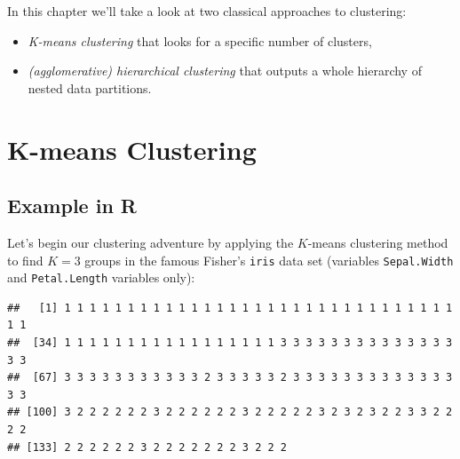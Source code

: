 \documentclass[10pt,b5paper,krantz1]{krantz}
\newenvironment{Shaded}{\begin{snugshade}}{\end{snugshade}}
\newcommand{\CommentTok}[1]{\textcolor[rgb]{0.37,0.37,0.37}{\textit{#1}}}
\newcommand{\DataTypeTok}[1]{\textcolor[rgb]{0.27,0.27,0.27}{#1}}
\newcommand{\DecValTok}[1]{\textcolor[rgb]{0.06,0.06,0.06}{#1}}
\newcommand{\KeywordTok}[1]{\textcolor[rgb]{0.27,0.27,0.27}{\textbf{#1}}}
\newcommand{\NormalTok}[1]{#1}
\newcommand{\OperatorTok}[1]{\textcolor[rgb]{0.43,0.43,0.43}{\textbf{#1}}}
\newcommand{\StringTok}[1]{\textcolor[rgb]{0.5,0.5,0.5}{#1}}
\providecommand{\tightlist}{%
  \setlength{\itemsep}{0pt}\setlength{\parskip}{0pt}}
\begin{document}
In this chapter we'll take a look at two classical approaches to clustering:

\begin{itemize}
\tightlist
\item
  \emph{K-means clustering} that looks for a specific number of clusters,
\item
  \emph{(agglomerative) hierarchical clustering} that outputs a whole hierarchy
  of nested data partitions.
\end{itemize}

\hypertarget{k-means-clustering}{%
\section{K-means Clustering}\label{k-means-clustering}}

\hypertarget{example-in-r-5}{%
\subsection{Example in R}\label{example-in-r-5}}

Let's begin our clustering adventure
by applying the \(K\)-means clustering method to find \(K=3\) groups
in the famous Fisher's \texttt{iris} data set (variables \texttt{Sepal.Width}
and \texttt{Petal.Length} variables only):

\begin{Shaded}
\end{Shaded}

\begin{verbatim}
##   [1] 1 1 1 1 1 1 1 1 1 1 1 1 1 1 1 1 1 1 1 1 1 1 1 1 1 1 1 1 1 1 1 1 1
##  [34] 1 1 1 1 1 1 1 1 1 1 1 1 1 1 1 1 1 3 3 3 3 3 3 3 3 3 3 3 3 3 3 3 3
##  [67] 3 3 3 3 3 3 3 3 3 3 3 2 3 3 3 3 3 2 3 3 3 3 3 3 3 3 3 3 3 3 3 3 3
## [100] 3 2 2 2 2 2 2 3 2 2 2 2 2 2 3 2 2 2 2 2 3 2 3 2 3 2 2 3 3 2 2 2 2
## [133] 2 2 2 2 2 2 3 2 2 2 2 2 2 2 3 2 2 2
\end{verbatim}
\end{document}
